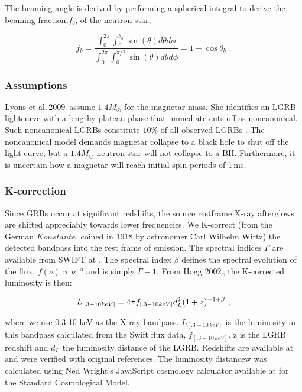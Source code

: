 \documentclass{article}
\begin{document}
The beaming angle is derived by performing a spherical integral to derive the beaming fraction,$f_b$, of the neutron star,

\begin{equation}
f_b=\frac{\int_0^{2\pi} \int_0^{\theta_b} \sin(\theta) d\theta d\phi}{\int_0^{2\pi} \int_0^{\pi/2} \sin(\theta) d\theta d\phi} = 1-\cos{\theta_b}\,\,.
\end{equation}

\subsubsection{Assumptions}

Lyons et al.\,2009\,\cite{Lyons:2009ka} assume $1.4 M_{\odot}$ for the magnetar mass. She identifies an LGRB lightcurve with a lengthy plateau phase that immediate cuts off as noncanonical. Such noncanonical LGRBs constitute $10\%$ of all observed LGRBs \cite{Lyons:2009ka}. The noncanonical model demands magnetar collapse to a black hole to shut off the light curve, but a $1.4 M_{\odot}$  neutron star will not collapse to a BH. Furthermore, it is uncertain how a magnetar will reach initial spin periods of 1\,ms.

\subsubsection{K-correction}
Since GRBs occur at significant redshifts, the source restframe X-ray afterglows are shifted appreciably towards lower frequencies. We K-correct (from the German $Konstante$, coined in 1918 by astronomer Carl Wilhelm Wirtz) the detected bandpass into the rest frame of emission. The spectral indices $\Gamma$ are available from SWIFT at \cite{swift}. The spectral index $\beta$ defines the spectral evolution of the flux, $f(\nu) \propto \nu^{-\beta}$ and is simply $\Gamma -1$. From Hogg 2002\,\cite{Hogg:2002yh}, the K-corrected luminosity is then:

\begin{equation} L_{[.3-10 keV]} = 4\pi\* f_{[.3-10 keV]}d_{L}^2  (1+z)^{-1+\beta}\,\,,
\end{equation}

where we use 0.3-10 keV as the X-ray bandpass.  $L_{[.3-10\,keV]}$ is the luminosity in this bandpass calculated from the Swift flux data,  $f_{[.3-10\,keV]}$. z is the LGRB redshift and $d_L$ the luminosity distance of the LGRB. Redshifts are available at \cite{grbhosts} and were verified with original references. The luminosity distancew was calculated using Ned Wright's JavaScript cosmology calculator available at \cite{cosmoc} for the Standard Cosmological Model.
\end{document}
